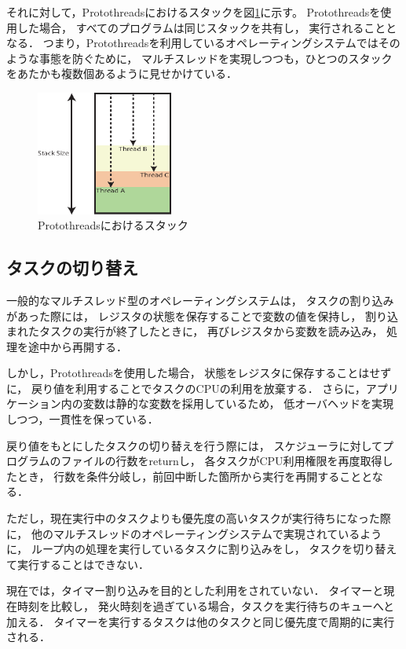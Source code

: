 それに対して，Protothreadsにおけるスタックを図\ref{fig:protothreads_stack}に示す。
Protothreadsを使用した場合，
すべてのプログラムは同じスタックを共有し，
実行されることとなる．
つまり，Protothreadsを利用しているオペレーティングシステムではそのような事態を防ぐために，
マルチスレッドを実現しつつも，ひとつのスタックをあたかも複数個あるように見せかけている．
\begin{figure}[htbp]
 \begin{center}
  \includegraphics[width=45mm]{./images/protothreads_stack.eps}
 \end{center}
 \caption{Protothreadsにおけるスタック}
 \label{fig:protothreads_stack}
\end{figure}


\subsection{タスクの切り替え}
一般的なマルチスレッド型のオペレーティングシステムは，
タスクの割り込みがあった際には，
レジスタの状態を保存することで変数の値を保持し，
割り込まれたタスクの実行が終了したときに，
再びレジスタから変数を読み込み，
処理を途中から再開する．

しかし，Protothreadsを使用した場合，
状態をレジスタに保存することはせずに，
戻り値を利用することでタスクのCPUの利用を放棄する．
さらに，アプリケーション内の変数は静的な変数を採用しているため，
低オーバヘッドを実現しつつ，一貫性を保っている．

戻り値をもとにしたタスクの切り替えを行う際には，
スケジューラに対してプログラムのファイルの行数をreturnし，
各タスクがCPU利用権限を再度取得したとき，
行数を条件分岐し，前回中断した箇所から実行を再開することとなる．

ただし，現在実行中のタスクよりも優先度の高いタスクが実行待ちになった際に，
他のマルチスレッドのオペレーティングシステムで実現されているように，
ループ内の処理を実行しているタスクに割り込みをし，
タスクを切り替えて実行することはできない．

現在では，タイマー割り込みを目的とした利用をされていない．
タイマーと現在時刻を比較し，
発火時刻を過ぎている場合，タスクを実行待ちのキューへと加える．
タイマーを実行するタスクは他のタスクと同じ優先度で周期的に実行される．

